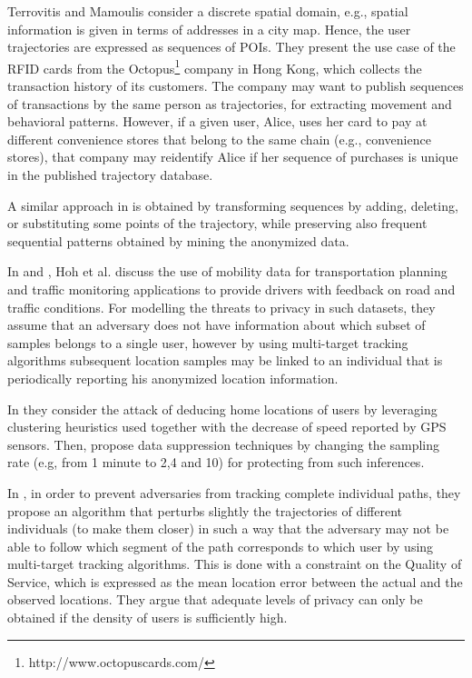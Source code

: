 \documentclass{llncs}
\begin{document}
Terrovitis and Mamoulis \cite{Terrovitis:2008} consider a discrete spatial domain, e.g., spatial information is given in terms of addresses in a city map.
Hence, the user trajectories are expressed as sequences of POIs.
They present the use case of the RFID cards from the Octopus\footnote{http://www.octopuscards.com/} company in Hong Kong, which collects the transaction history of its customers. The company may want to publish sequences of transactions by the same person as trajectories, for extracting movement and behavioral patterns. However, if a given user, Alice, uses her card to pay at different convenience stores that belong to the same chain (e.g., convenience stores), that company may reidentify Alice if her sequence of purchases is unique in the published trajectory database.


A similar approach in \cite{Pensa2008} is obtained by transforming sequences by adding, deleting, or substituting some points of the trajectory, while preserving also frequent sequential patterns \cite{Agrawal:1995} obtained by mining the anonymized data.


In \cite{Hoh2005} and \cite{Hoh06}, Hoh et al. discuss the use of mobility data for transportation planning and traffic monitoring applications to provide drivers with feedback on road and traffic conditions.
For modelling the threats to privacy in such datasets, they assume that an adversary does not have information about which subset of samples belongs to a single user, however by using multi-target tracking algorithms \cite{Reid79analgorithm} subsequent location samples may be linked to an individual that is periodically reporting his anonymized location information.

In \cite{Hoh06} they consider the attack of deducing home locations of users by leveraging clustering heuristics used together with the decrease of speed reported by GPS sensors. Then, propose data suppression techniques by changing the sampling rate (e.g, from 1 minute to 2,4 and 10) for protecting from such inferences.

In \cite{Hoh2005}, in order to prevent adversaries from tracking complete individual paths, they propose an algorithm that perturbs slightly the trajectories of different individuals (to make them closer) in such a way that the adversary may not be able to follow which segment of the path corresponds to which user by using multi-target tracking algorithms.
This is done with a constraint on the Quality of Service, which is expressed as the mean location error between the actual and the observed locations. They argue that adequate levels of privacy can only be obtained if the density of users is sufficiently high.
\end{document}
